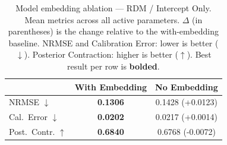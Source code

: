 \begin{table}[t]
\centering
\caption{Model embedding ablation — RDM / Intercept Only. Mean metrics across
all active parameters. $\Delta$ (in parentheses) is the change relative to the
with-embedding baseline. NRMSE and Calibration Error: lower is better ($\downarrow$).
Posterior Contraction: higher is better ($\uparrow$). Best result per row is
\textbf{bolded}.}
\label{tab:embed_ablation_rdm_intercept_only}
\begin{tabular}{lcc}
\toprule
 & With Embedding & No Embedding \\
\midrule
NRMSE $\downarrow$ & \textbf{0.1306} & 0.1428 \small{(+0.0123)} \\
Cal.\ Error $\downarrow$ & \textbf{0.0202} & 0.0217 \small{(+0.0014)} \\
Post.\ Contr. $\uparrow$ & \textbf{0.6840} & 0.6768 \small{(-0.0072)} \\
\bottomrule
\end{tabular}
\end{table}